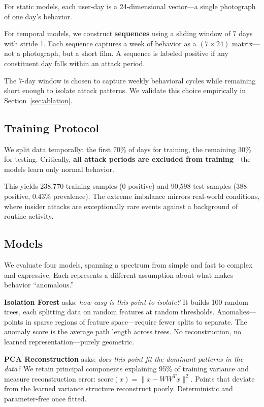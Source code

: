 \documentclass[conference]{IEEEtran}
\begin{document}
For static models, each user-day is a 24-dimensional vector---a single photograph of one day's behavior.

For temporal models, we construct \textbf{sequences} using a sliding window of 7 days with stride 1. Each sequence captures a week of behavior as a $(7 \times 24)$ matrix---not a photograph, but a short film. A sequence is labeled positive if any constituent day falls within an attack period.

The 7-day window is chosen to capture weekly behavioral cycles while remaining short enough to isolate attack patterns. We validate this choice empirically in Section~\ref{sec:ablation}.

\subsection{Training Protocol}

We split data temporally: the first 70\% of days for training, the remaining 30\% for testing. Critically, \textbf{all attack periods are excluded from training}---the models learn only normal behavior.

This yields 238,770 training samples (0 positive) and 90,598 test samples (388 positive, 0.43\% prevalence). The extreme imbalance mirrors real-world conditions, where insider attacks are exceptionally rare events against a background of routine activity.

\subsection{Models}
\label{sec:models}

We evaluate four models, spanning a spectrum from simple and fast to complex and expressive. Each represents a different assumption about what makes behavior ``anomalous.''

\textbf{Isolation Forest} \cite{liu2008isolation} asks: \textit{how easy is this point to isolate?} It builds 100 random trees, each splitting data on random features at random thresholds. Anomalies---points in sparse regions of feature space---require fewer splits to separate. The anomaly score is the average path length across trees. No reconstruction, no learned representation---purely geometric.

\textbf{PCA Reconstruction} asks: \textit{does this point fit the dominant patterns in the data?} We retain principal components explaining 95\% of training variance and measure reconstruction error: $\text{score}(x) = \|x - WW^Tx\|^2$. Points that deviate from the learned variance structure reconstruct poorly. Deterministic and parameter-free once fitted.
\end{document}
